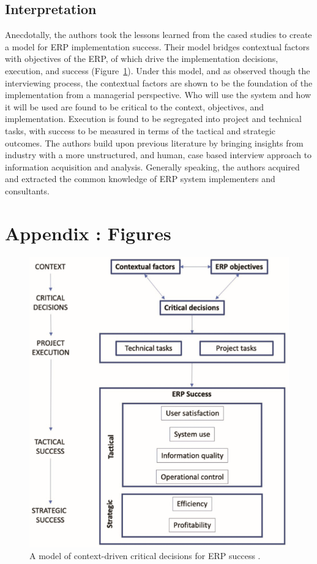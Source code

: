 \documentclass{article}
\begin{document}
\subsection{Interpretation}
Anecdotally, the authors took the lessons learned from the cased studies to create a model for ERP implementation success. 
Their model bridges contextual factors with objectives of the ERP, of which drive the implementation decisions, execution, and success (Figure~\ref{fig:ERP_Success_Model}). 
Under this model, and as observed though the interviewing process, the contextual factors are shown to be the foundation of the implementation from a managerial perspective. 
Who will use the system and how it will be used are found to be critical to the context, objectives, and implementation. 
Execution is found to be segregated into project and technical tasks, with success to be measured in terms of the tactical and strategic outcomes. 
The authors build upon previous literature by bringing insights from industry with a more unstructured, and human, case based interview approach to information acquisition and analysis. 
Generally speaking, the authors acquired and extracted the common knowledge of ERP system implementers and consultants.

\newpage

\section{Appendix : Figures}

\begin{figure}[ht!]
    \centering
    \includegraphics[width=\textwidth]{./ERP_Success_Model.PNG}
    \caption{A model of context-driven critical decisions for ERP success \cite{integrated_erp}.}
    \label{fig:ERP_Success_Model}
\end{figure}

\newpage

{}
\end{document}
